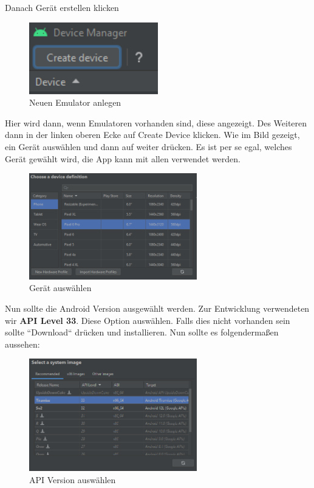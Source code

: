 Danach Gerät erstellen klicken
\begin{figure}[!h]
\centering
\vspace{0.5cm}
\includegraphics[width=0.5\textwidth]{FLUTTER/images/ZB/android_studio_add_device.png}
\caption{Neuen Emulator anlegen}
\end{figure}

Hier wird dann, wenn Emulatoren vorhanden sind, diese angezeigt. Des Weiteren dann in der linken oberen Ecke auf Create Device klicken. Wie im Bild gezeigt, ein Gerät auswählen und dann auf weiter drücken. Es ist per se egal, welches Gerät gewählt wird, die App kann mit allen verwendet werden.
\begin{figure}[!h]
\centering
\vspace{0.5cm}
\includegraphics[width=0.65\textwidth]{FLUTTER/images/ZB/android_studio_device_select.png}
\caption{Gerät auswählen}
\end{figure}

Nun sollte die Android Version ausgewählt werden. Zur Entwicklung verwendeten wir \textbf{API Level 33}. Diese Option auswählen. Falls dies nicht vorhanden sein sollte ``Download`` drücken und installieren. Nun sollte es folgendermaßen aussehen:
\begin{figure}[!h]
\vspace{0.5cm}
\centering
\includegraphics[width=0.65\textwidth]{FLUTTER/images/ZB/android_studio_version_select.png}
\caption{API Version auswählen}
\end{figure}

